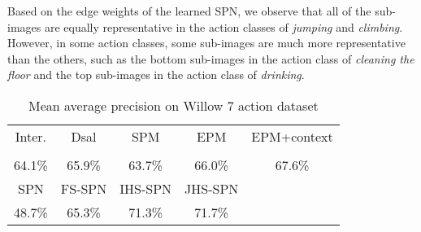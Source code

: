 \documentclass[journal]{IEEEtran}
\begin{document}
Based on the edge weights of the learned SPN, we observe that all of the sub-images are equally representative in the action classes of \textit{jumping} and \textit{climbing}. However, in some action classes, some sub-images are much more representative than the others, such as the bottom sub-images in the action class of \textit{cleaning the floor} and the top sub-images in the action class of \textit{drinking}.






\begin{table}[h!]
    \caption{Mean average precision on Willow 7 action dataset}
    \begin{center}

        \begin{tabular}{c c c c c}
            \hline

            \hline
             Inter. & Dsal & SPM  & EPM  & EPM+context \\
            \cite{Delaitre11learningperson-object} & \cite{sharma:CVPR2012_Discriminative} & \cite{Lazebnik_beyond_cvpr2006} & \cite{sharma:CVPR2013} & \cite{sharma:CVPR2013}\\
        \hline
     64.1\% & 65.9\% & 63.7\% & 66.0\% & 67.6\%\\
			\hline
			\hline

			\hline
SPN & FS-SPN & IHS-SPN & JHS-SPN \\ \hline
48.7\% & 65.3\% & 71.3\% & 71.7\%\\ \hline

 \hline
       \end{tabular}

    \end{center}



    \label{tab:willow_recognition_accuracy}
\end{table}
\end{document}
